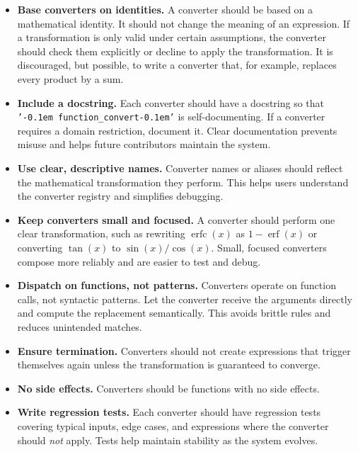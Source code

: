 \documentclass[12pt,fleqn]{extarticle}
\newcommand{\ttq}[1]{\texttt{'\kern-0.1em #1\kern-0.1em'}}
\newcommand{\funconvert}{\ttq{function\_convert}{ }}
\DeclareMathOperator{\erf}{erf}
\DeclareMathOperator{\erfc}{erfc}
\begin{document}
\begin{itemize}

  \item \textbf{Base converters on identities.}
        A converter should be based on a mathematical identity.
        It should not change the meaning of an expression. If a transformation is only valid under certain
        assumptions, the converter should check them explicitly or decline
        to apply the transformation. It is discouraged, but possible, to
        write a converter that, for example, replaces every product by a sum.

  \item \textbf{Include a docstring.}
        Each converter should have a docstring so that \funconvert is
        self-documenting. If a converter requires a domain restriction, document it. 
        Clear documentation prevents
        misuse and helps future contributors maintain the system.

  \item \textbf{Use clear, descriptive names.}
        Converter names or aliases should reflect the mathematical
        transformation they perform. This helps users understand the
        converter registry and simplifies debugging.

  \item \textbf{Keep converters small and focused.}
        A converter should perform one clear transformation, such as
        rewriting \(\erfc(x)\) as \(1 - \erf(x)\) or converting
        \(\tan(x)\) to \(\sin(x)/\cos(x)\). Small, focused converters
        compose more reliably and are easier to test and debug.

  \item \textbf{Dispatch on functions, not patterns.}
        Converters operate on function calls, not syntactic patterns. Let
        the converter receive the arguments directly and compute the
        replacement semantically. This avoids brittle rules and reduces
        unintended matches.

  \item \textbf{Ensure termination.}
        Converters should not create expressions that trigger themselves
        again unless the transformation is guaranteed to converge.
        
\item \textbf{No side effects.} Converters should be functions with no side effects.

  \item \textbf{Write regression tests.}
        Each converter should have regression tests covering typical
        inputs, edge cases, and expressions where the converter should
        \emph{not} apply. Tests help maintain stability as the system
        evolves.

\end{itemize}
\end{document}
